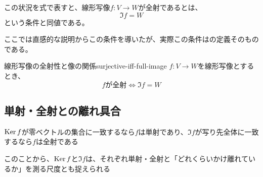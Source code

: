 \documentclass[../../../topic_linear-algebra]{subfiles}
\begin{document}
\br

この状況を式で表すと、線形写像$f\colon V \to W$が全射であるとは、
\begin{equation*}
  \Im f = W
\end{equation*}
という条件と同値である。

\br

ここでは直感的な説明からこの条件を導いたが、実際この条件はの定義そのものである。

\begin{theorem}{線形写像の全射性と像の関係}{surjective-iff-full-image}
  $f\colon V \to W$を線形写像とするとき、
  \begin{equation*}
    f\text{が全射} \Longleftrightarrow \Im f = W
  \end{equation*}
\end{theorem}

\subsection{単射・全射との離れ具合}

$\operatorname{Ker} f$が零ベクトルの集合に一致するなら$f$は単射であり、$\Im f$が写り先全体に一致するなら$f$は全射である

\br

このことから、$\operatorname{Ker} f$と$\Im f$は、それぞれ単射・全射と「どれくらいかけ離れているか」を測る尺度とも捉えられる

\br
\end{document}
